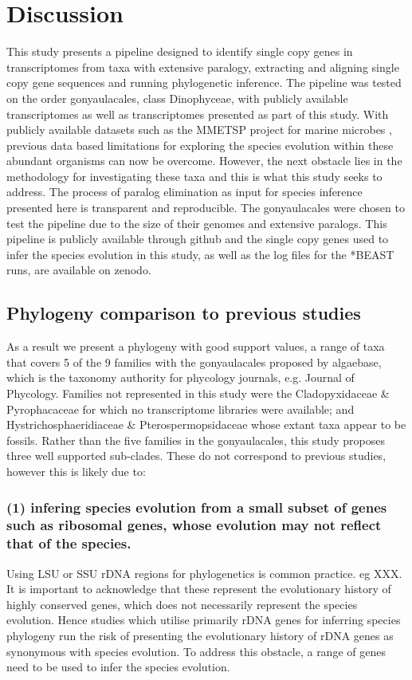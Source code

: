 \documentclass[12pt]{article}
\begin{document}
\section{Discussion}
This study presents a pipeline designed to identify single copy genes in transcriptomes from taxa with extensive paralogy, extracting and aligning single copy gene sequences and running phylogenetic inference. 
The pipeline was tested on the order gonyaulacales, class Dinophyceae, with publicly available transcriptomes as well as transcriptomes presented as part of this study. 
With publicly available datasets such as the MMETSP project for marine microbes \cite{keeling2014marine}, previous data based limitations for exploring the species evolution within these abundant organisms can now be overcome. 
However, the next obstacle lies in the methodology for investigating these taxa and this is what this study seeks to address. 
The process of paralog elimination as input for species inference presented here is transparent and reproducible. 
The gonyaulacales were chosen to test the pipeline due to the size of their genomes and extensive paralogs.
This pipeline is publicly available through github and the single copy genes used to infer the species evolution in this study, as well as the log files for the *BEAST runs, are available on zenodo.
\subsection*{Phylogeny comparison to previous studies} 
As a result we present a phylogeny with good support values, a range of taxa that covers 5 of the 9 families with the gonyaulacales proposed by algaebase, which is the taxonomy authority for phycology journals, e.g. Journal of Phycology. 
Families not represented in this study were the Cladopyxidaceae \& Pyrophacaceae for which no transcriptome libraries were available; and Hystrichosphaeridiaceae \& Pterospermopsidaceae whose extant taxa appear to be fossils.
Rather than the five families in the gonyaulacales, this study proposes three well supported sub-clades. 
These do not correspond to previous studies, however this is likely due to: 
\subsubsection*{(1) infering species evolution from a small subset of genes such as ribosomal genes, whose evolution may not reflect that of the species.}
Using LSU or SSU rDNA regions for phylogenetics is common practice. eg XXX. 
It is important to acknowledge that these represent the evolutionary history of highly conserved genes, which does not necessarily represent the species evolution. 
Hence studies which utilise primarily rDNA genes for inferring species phylogeny run the risk of presenting the evolutionary history of rDNA genes as synonymous with species evolution.
To address this obstacle, a range of genes need to be used to infer the species evolution.
\end{document}
